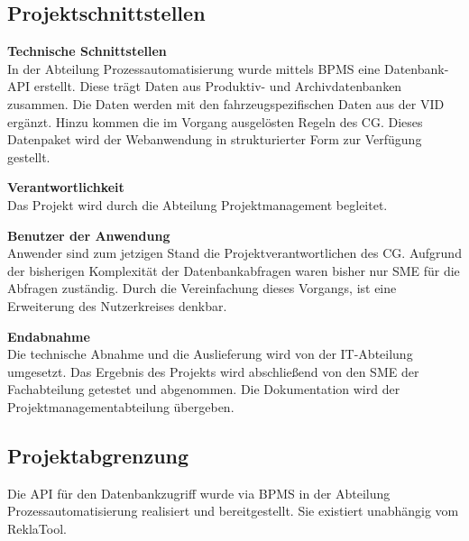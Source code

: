 \subsection{Projektschnittstellen} 
\label{sec:Projektschnittstellen}
\textbf{Technische Schnittstellen}\\
In der Abteilung Prozessautomatisierung wurde mittels \acs{BPMS} eine Datenbank-\acs{API} erstellt.
Diese trägt Daten aus Produktiv- und Archivdatenbanken zusammen.
Die Daten werden mit den fahrzeugspezifischen Daten aus der \acs{VID} ergänzt.
Hinzu kommen die im Vorgang ausgelösten Regeln des \acs{CG}.
Dieses Datenpaket wird der Webanwendung in strukturierter Form zur Verfügung gestellt.

\textbf{Verantwortlichkeit}\\
Das Projekt wird durch die Abteilung Projektmanagement begleitet.

\textbf{Benutzer der Anwendung}\\
Anwender sind zum jetzigen Stand die Projektverantwortlichen des \acs{CG}.
Aufgrund der bisherigen Komplexität der Datenbankabfragen waren bisher nur \ac{SME}
für die Abfragen zuständig. Durch die Vereinfachung dieses Vorgangs, ist eine Erweiterung des Nutzerkreises denkbar.

\textbf{Endabnahme}\\
Die technische Abnahme und die Auslieferung wird von der IT-Abteilung umgesetzt.
Das Ergebnis des Projekts wird abschließend von den \acs{SME} der Fachabteilung getestet und abgenommen.
Die Dokumentation wird der Projektmanagementabteilung übergeben.

\subsection{Projektabgrenzung} 
\label{sec:Projektabgrenzung}
Die \acs{API} für den Datenbankzugriff wurde via \acs{BPMS} in der Abteilung Prozessautomatisierung realisiert und bereitgestellt. 
Sie existiert unabhängig vom ReklaTool.
\clearpage